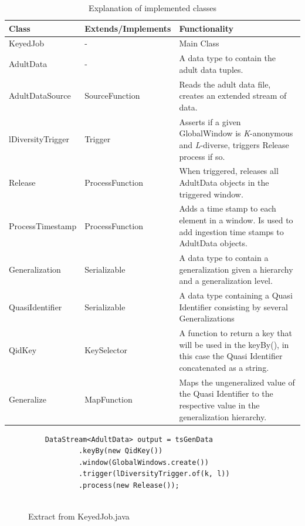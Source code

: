 \begin{table}[H]
\centering
\begin{tabular}{llll}

\toprule
Class & Extends/Implements & Functionality \\ \hline
KeyedJob & - & Main Class \\ 

AdultData & - & \multicolumn{2}{p{8cm}}{ A data type to contain the adult data tuples. }\\ 
AdultDataSource & SourceFunction & \multicolumn{2}{p{8cm}}{ Reads the adult data file, creates an extended stream of data. }\\ 


lDiversityTrigger & Trigger & \multicolumn{2}{p{8cm}}{ Asserts if a given GlobalWindow is \textit{K}-anonymous and \textit{L}-diverse, triggers Release process if so.}\\ 


Release & ProcessFunction & \multicolumn{2}{p{8cm}}{ When triggered, releases all AdultData objects in the triggered window. }\\ 
ProcessTimestamp & ProcessFunction & \multicolumn{2}{p{8cm}}{ Adds a time stamp to each element in a window. Is used to add ingestion time stamps to AdultData objects. }\\ 

Generalization & Serializable & \multicolumn{2}{p{8cm}}{ A data type to contain a generalization given a hierarchy and a generalization level.  }\\ 
QuasiIdentifier & Serializable & \multicolumn{2}{p{8cm}}{ A data type containing a Quasi Identifier consisting by several Generalizations  }\\ 
QidKey & KeySelector & \multicolumn{2}{p{8cm}}{ A function to return a key that will be used in the keyBy(), in this case the Quasi Identifier concatenated as a string.  }\\ 
Generalize & MapFunction & \multicolumn{2}{p{8cm}}{ Maps the ungeneralized value of the Quasi Identifier to the respective value in the generalization hierarchy. }\\ 




\bottomrule
\end{tabular}
\caption{Explanation of implemented classes}
\label{datacharac}
\end{table}


\begin{figure}[H]
    \begin{lstlisting}
    DataStream<AdultData> output = tsGenData
            .keyBy(new QidKey())
            .window(GlobalWindows.create())
            .trigger(lDiversityTrigger.of(k, l))
            .process(new Release());
            
    \end{lstlisting}
    \caption{Extract from KeyedJob.java}
    \label{fig:code}
\end{figure}

